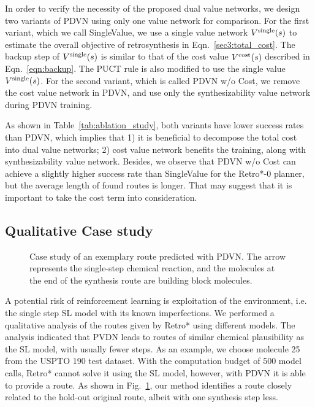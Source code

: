\documentclass[nohyperref]{article}
\theoremstyle{plain}
\theoremstyle{definition}
\theoremstyle{remark}
\begin{document}
In order to verify the necessity of the proposed dual value networks, we design two variants of PDVN using only one value network for comparison. 
For the first variant, which we call SingleValue, we use a single value network $V^{\rm single}(s)$ to estimate the overall objective of retrosynthesis in Eqn.~\ref{sec3:total_cost}.
The backup step of $V^{\rm single}(s)$ is similar to that of  the cost value $V^{\rm cost}(s)$ described in Eqn.~\ref{eqn:backup}.
The PUCT rule is also modified to use the single value $V^{\rm single}(s)$.
For the second variant, which is called PDVN w/o Cost, we remove the cost value network in PDVN, and use only the synthesizability value network during PDVN training. 



As shown in Table~\ref{tab:ablation_study}, both variants have lower success rates than PDVN, which implies that 1) it is beneficial to decompose the total cost into dual value networks;
2) cost value network benefits the training, along with synthesizability value network.
Besides, we observe that PDVN w/o Cost can achieve a slightly higher success rate than SingleValue for the Retro*-0 planner, but the average length of found routes is longer.  
That may suggest that it is important to take 
the cost term into consideration.




\subsection{Qualitative Case study}

\begin{figure}[t]
\caption{
{
Case study of an exemplary route predicted with PDVN. The arrow represents the single-step chemical reaction,
and the molecules at the end of the synthesis route are building block molecules.
}
}
\label{fig:case_study}
\end{figure}

A potential risk of reinforcement learning is exploitation of the environment, i.e. the single step SL model with its known imperfections. We performed a qualitative analysis of the routes given by Retro* using different models. The analysis indicated that PVDN leads to routes of similar chemical plausibility as the SL model, with usually fewer steps. 
As an example, we choose molecule 25 from the USPTO 190 test dataset. With the computation budget of 500 model calls, Retro* cannot solve it using the SL model, however, with PDVN it is able to provide a route. 
As shown in Fig.~\ref{fig:case_study}, our method identifies a route closely related to the hold-out original route, albeit with one synthesis step less. 
\end{document}
